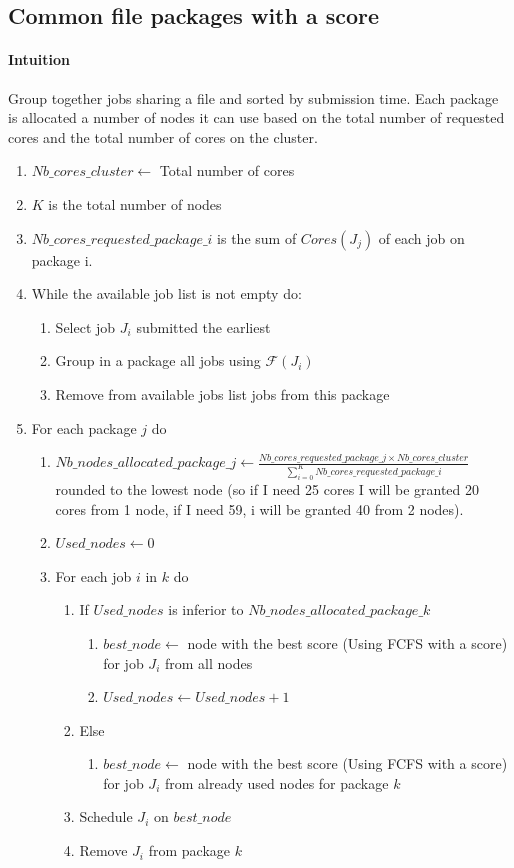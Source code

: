 \documentclass[a4paper]{article}
\newcommand{\inputs}{\ensuremath{\mathcal{F}}\xspace}
\newcommand{\core}{\mathit{Cores}\xspace}
\begin{document}
\subsection{Common file packages with a score}
\paragraph{Intuition}
Group together jobs sharing a file and sorted by submission time.
Each package is allocated a number of nodes it can use based on the total number of requested cores and the total number of cores on the cluster.

\begin{enumerate}
	\item $Nb\_cores\_cluster \gets$ Total number of cores
	\item $K$ is the total number of nodes
	\item $Nb\_cores\_requested\_package\_i$ is the sum of $\core(J_j)$ of each job on package i.
	\item While the available job list is not empty do:
	\begin{enumerate}
		\item Select job $J_i$ submitted the earliest
		\item Group in a package all jobs using $\inputs(J_i)$
		\item Remove from available jobs list jobs from this package
	\end{enumerate}
	\item For each package $j$ do
	\begin{enumerate}
		\item $Nb\_nodes\_allocated\_package\_j \gets \frac{Nb\_cores\_requested\_package\_j \times Nb\_cores\_cluster}{\sum_{i=0}^{K} Nb\_cores\_requested\_package\_i}$ rounded to the lowest node (so if I need 25 cores I will be granted 20 cores from 1 node, if I need 59, i will be granted 40 from 2 nodes).
		\item $Used\_nodes \gets 0$
		\item For each job $i$ in $k$ do
		\begin{enumerate}
			\item If $Used\_nodes$ is inferior to $Nb\_nodes\_allocated\_package\_k$
				\begin{enumerate}
					\item $best\_node \gets$ node with the best score (Using FCFS with a score) for job $J_i$ from all nodes
					\item $Used\_nodes \gets Used\_nodes + 1$
				\end{enumerate}
			\item Else
				\begin{enumerate}
					\item $best\_node \gets$ node with the best score (Using FCFS with a score) for job $J_i$ from already used nodes for package $k$
				\end{enumerate}
			\item Schedule $J_i$ on $best\_node$
			\item Remove $J_i$ from package $k$
		\end{enumerate}
	\end{enumerate}
\end{enumerate}
\end{document}
